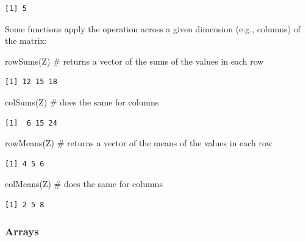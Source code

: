 \documentclass[
  letterpaper,
  DIV=11,
  numbers=noendperiod]{scrreprt}
\newenvironment{Shaded}{\begin{snugshade}}{\end{snugshade}}
\newcommand{\CommentTok}[1]{\textcolor[rgb]{0.37,0.37,0.37}{#1}}
\newcommand{\FunctionTok}[1]{\textcolor[rgb]{0.28,0.35,0.67}{#1}}
\newcommand{\NormalTok}[1]{\textcolor[rgb]{0.00,0.23,0.31}{#1}}
\begin{document}
\begin{verbatim}
[1] 5
\end{verbatim}

Some functions apply the operation across a given dimension (e.g.,
columns) of the matrix:

\begin{Shaded}
\begin{Highlighting}[]
\FunctionTok{rowSums}\NormalTok{(Z) }\CommentTok{\# returns a vector of the sums of the values in each row}
\end{Highlighting}
\end{Shaded}

\begin{verbatim}
[1] 12 15 18
\end{verbatim}

\begin{Shaded}
\begin{Highlighting}[]
\FunctionTok{colSums}\NormalTok{(Z) }\CommentTok{\# does the same for columns}
\end{Highlighting}
\end{Shaded}

\begin{verbatim}
[1]  6 15 24
\end{verbatim}

\begin{Shaded}
\begin{Highlighting}[]
\FunctionTok{rowMeans}\NormalTok{(Z) }\CommentTok{\# returns a vector of the means of the values in each row}
\end{Highlighting}
\end{Shaded}

\begin{verbatim}
[1] 4 5 6
\end{verbatim}

\begin{Shaded}
\begin{Highlighting}[]
\FunctionTok{colMeans}\NormalTok{(Z) }\CommentTok{\# does the same for columns}
\end{Highlighting}
\end{Shaded}

\begin{verbatim}
[1] 2 5 8
\end{verbatim}

\hypertarget{arrays}{%
\subsubsection{Arrays}\label{arrays}}
\end{document}
